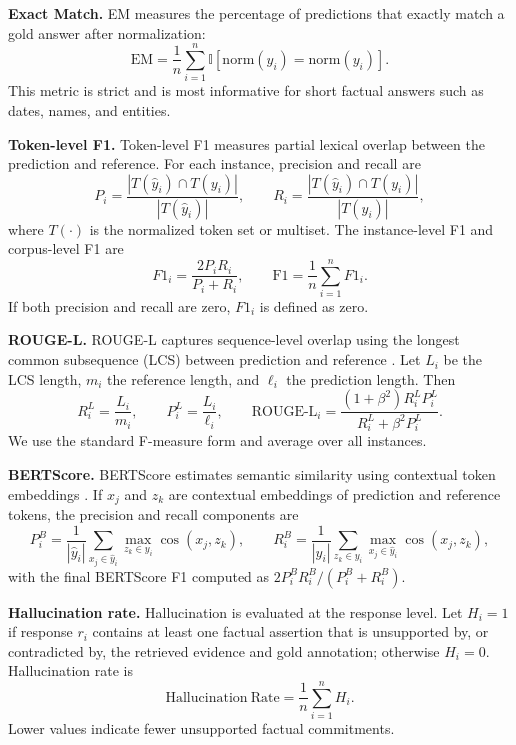 \documentclass[preprint,12pt,authoryear,nopreprintline]{elsarticle}
\begin{document}
\textbf{Exact Match.} EM measures the percentage of predictions that exactly match a gold answer after normalization:
\begin{equation}
    \mathrm{EM}=\frac{1}{n}\sum_{i=1}^{n}\mathbb{I}\left[\mathrm{norm}(\hat{y}_i)=\mathrm{norm}(y_i)\right].
\end{equation}
This metric is strict and is most informative for short factual answers such as dates, names, and entities.

\textbf{Token-level F1.} Token-level F1 measures partial lexical overlap between the prediction and reference. For each instance, precision and recall are
\begin{equation}
    P_i=\frac{|T(\hat{y}_i)\cap T(y_i)|}{|T(\hat{y}_i)|}, \qquad
    R_i=\frac{|T(\hat{y}_i)\cap T(y_i)|}{|T(y_i)|},
\end{equation}
where $T(\cdot)$ is the normalized token set or multiset. The instance-level F1 and corpus-level F1 are
\begin{equation}
    F1_i=\frac{2P_iR_i}{P_i+R_i}, \qquad
    \mathrm{F1}=\frac{1}{n}\sum_{i=1}^{n}F1_i.
\end{equation}
If both precision and recall are zero, $F1_i$ is defined as zero.

\textbf{ROUGE-L.} ROUGE-L captures sequence-level overlap using the longest common subsequence (LCS) between prediction and reference \citep{Lin2004ROUGE}. Let $L_i$ be the LCS length, $m_i$ the reference length, and $\ell_i$ the prediction length. Then
\begin{equation}
    R^{L}_i=\frac{L_i}{m_i}, \qquad P^{L}_i=\frac{L_i}{\ell_i}, \qquad
    \mathrm{ROUGE\mbox{-}L}_i=\frac{(1+\beta^2)R^{L}_iP^{L}_i}{R^{L}_i+\beta^2P^{L}_i}.
\end{equation}
We use the standard F-measure form and average over all instances.

\textbf{BERTScore.} BERTScore estimates semantic similarity using contextual token embeddings \citep{Zhang2020BERTScore}. If $x_j$ and $z_k$ are contextual embeddings of prediction and reference tokens, the precision and recall components are
\begin{equation}
    P^{B}_i=\frac{1}{|\hat{y}_i|}\sum_{x_j\in \hat{y}_i}\max_{z_k\in y_i} \cos(x_j,z_k), \qquad
    R^{B}_i=\frac{1}{|y_i|}\sum_{z_k\in y_i}\max_{x_j\in \hat{y}_i} \cos(x_j,z_k),
\end{equation}
with the final BERTScore F1 computed as $2P^{B}_iR^{B}_i/(P^{B}_i+R^{B}_i)$.

\textbf{Hallucination rate.} Hallucination is evaluated at the response level. Let $H_i=1$ if response $r_i$ contains at least one factual assertion that is unsupported by, or contradicted by, the retrieved evidence and gold annotation; otherwise $H_i=0$. Hallucination rate is
\begin{equation}
    \mathrm{Hallucination\ Rate}=\frac{1}{n}\sum_{i=1}^{n}H_i.
\end{equation}
Lower values indicate fewer unsupported factual commitments.
\end{document}
